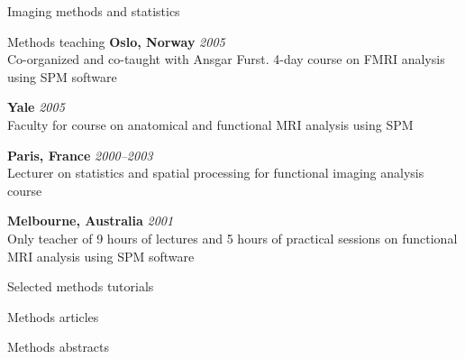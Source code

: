 \documentclass{cv}
\newcommand{\PlaceDateNote}[3]{{\bf #1} \hfill {\em #2} \\#3}
\begin{document}
\begin{cvSection}{Imaging methods and statistics}
\begin{cvSubSection}{Methods teaching}
\PlaceDateNote{Oslo, Norway}{2005}
{Co-organized and co-taught with Ansgar Furst. 4-day course on FMRI analysis
using SPM software}

\PlaceDateNote{Yale}{2005}
{Faculty for course on anatomical and functional MRI analysis using SPM}

\PlaceDateNote{Paris, France}{2000--2003}
{Lecturer on statistics and spatial processing for functional imaging analysis
course}

\PlaceDateNote{Melbourne, Australia}{2001}
{Only teacher of 9 hours of lectures and 5 hours of practical sessions on
functional MRI analysis using SPM software}

\end{cvSubSection}

\begin{cvSubSection}{Selected methods tutorials}

\printbibliography[heading=none,
    filter=imagingOrStatistics,
    keyword=online,
notkeyword=omit]

\end{cvSubSection}

\begin{cvSubSection}{Methods articles}

\printbibliography[heading=none,
    keyword=methods,
    keyword=article,
notkeyword=omit]

\end{cvSubSection}

\begin{cvSubSection}{Methods abstracts}

\printbibliography[heading=none,
    keyword=methods,
    keyword=abstract,
notkeyword=omit]

\end{cvSubSection}

\end{cvSection}
\end{document}
